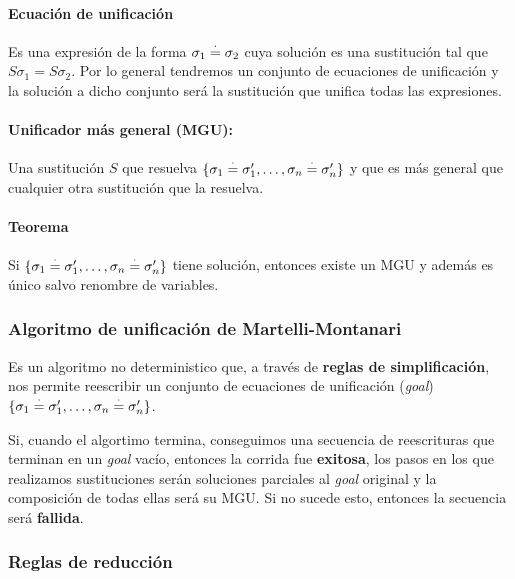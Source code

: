 \paragraph{Ecuación de unificación} Es una expresión de la forma $\sigma_1 \overset{\cdot}{=} \sigma_2$ cuya solución es una sustitución tal que $S\sigma_1 = S\sigma_2$. Por lo general tendremos un conjunto de ecuaciones de unificación y la solución a dicho conjunto será la sustitución que unifica todas las expresiones.

\paragraph{Unificador más general (MGU):} Una sustitución $S$ que resuelva $\{\sigma_1 \overset{\cdot}{=} \sigma_1',\dots,\sigma_n \overset{\cdot}{=} \sigma_n'\}$ y que es más general que cualquier otra sustitución que la resuelva.

\paragraph{Teorema} Si $\{\sigma_1 \overset{\cdot}{=} \sigma_1',\dots,\sigma_n \overset{\cdot}{=} \sigma_n'\}$ tiene solución, entonces existe un MGU y además es único salvo renombre de variables.

\subsubsection{Algoritmo de unificación de Martelli-Montanari}
Es un algoritmo no deterministico que, a través de \textbf{reglas de simplificación}, nos permite reescribir un conjunto de ecuaciones de unificación (\textit{goal}) $\{\sigma_1 \overset{\cdot}{=} \sigma_1',\dots,\sigma_n \overset{\cdot}{=} \sigma_n'\}$. 

Si, cuando el algortimo termina, conseguimos  una secuencia de reescrituras que terminan en un \textit{goal} vacío, entonces la corrida fue \textbf{exitosa}, los pasos en los que realizamos sustituciones serán soluciones parciales al \textit{goal} original y la composición de todas ellas será su MGU. Si no sucede esto, entonces la secuencia será \textbf{fallida}.

\subsubsection{Reglas de reducción}

